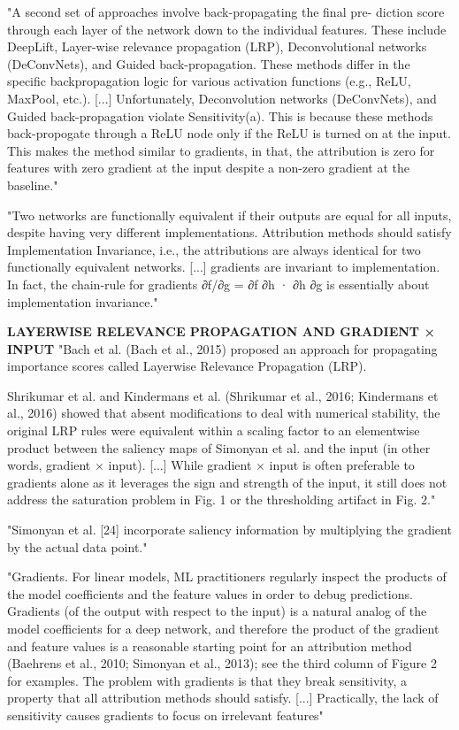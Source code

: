 		"A second set of approaches involve back-propagating the final pre- diction score through each layer of the network down to the individual features. These include DeepLift, Layer-wise relevance propagation (LRP), Deconvolutional networks (DeConvNets), and Guided back-propagation. These methods differ in the specific backpropagation logic for various activation functions (e.g., ReLU, MaxPool, etc.).
		[...]
		Unfortunately, Deconvolution networks (DeConvNets), and Guided back-propagation violate Sensitivity(a). This is because these methods back-propogate through a ReLU node only if the ReLU is turned on at the input. This makes the method similar to gradients, in that, the attribution is zero for features with zero gradient at the input despite a non-zero gradient at the baseline." \cite{Sundararajan2017}
		
		"Two networks are functionally equivalent if their outputs are equal for all inputs, despite having very different implementations. Attribution methods should satisfy Implementation Invariance, i.e., the attributions are always identical for two functionally equivalent networks.
		[...]
		gradients are invariant to implementation. In fact, the chain-rule for gradients ∂f/∂g = ∂f ∂h · ∂h ∂g is essentially about implementation invariance." \cite{Sundararajan2017}
		
		\textbf{LAYERWISE RELEVANCE PROPAGATION AND GRADIENT × INPUT}
			"Bach et al. (Bach et al., 2015) proposed an approach for propagating importance scores called Layerwise Relevance Propagation (LRP).
			
			Shrikumar et al. and Kindermans et al. (Shrikumar et al., 2016; Kindermans et al., 2016) showed that absent modifications to deal with numerical stability, the original LRP rules were equivalent within a scaling factor to an elementwise product between the saliency maps of Simonyan et al. and the input (in other words, gradient × input).
			[...]
			While gradient × input is often preferable to gradients alone as it leverages the sign and strength of the input, it still does not address the saturation problem in Fig. 1 or the thresholding artifact in Fig. 2." \cite{Shrikumar2017}
			
			"Simonyan et al. [24] incorporate saliency information by multiplying the gradient by the actual data point." \cite{Montavon2017}
			
			"Gradients. For linear models, ML practitioners regularly inspect the products of the model coefficients and the feature values in order to debug predictions. Gradients (of the output with respect to the input) is a natural analog of the model coefficients for a deep network, and therefore the product of the gradient and feature values is a reasonable starting point for an attribution method (Baehrens et al., 2010; Simonyan et al., 2013); see the third column of Figure 2 for examples. The problem with gradients is that they break sensitivity, a property that all attribution methods should satisfy.
			[...]
			Practically, the lack of sensitivity causes gradients to focus on irrelevant features" \cite{Sundararajan2017}
			
